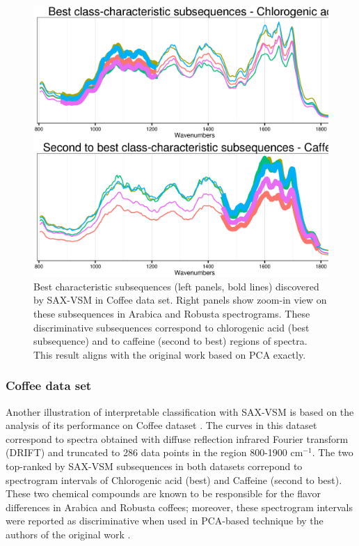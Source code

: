 \begin{figure}[ht]
   \centering
   \includegraphics[width=120mm]{figures/coffee_patterns.ps}
   \caption{
   Best characteristic subsequences (left panels, bold lines) discovered by SAX-VSM in
   {Coffee data set}. Right panels show zoom-in view on these subsequences in Arabica
   and Robusta spectrograms.
   These discriminative subsequences correspond to chlorogenic acid (best subsequence) 
   and to caffeine (second to best) regions of spectra. This result aligns with
   the original work based on PCA \cite{citeulike:12550833} exactly.
   }
   \label{fig:coffee}
\end{figure}

\subsubsection{Coffee data set}
Another illustration of interpretable classification with SAX-VSM is based on the analysis of its
performance on Coffee dataset \cite{citeulike:12550833}. The curves in this dataset correspond to spectra
obtained with diffuse reflection infrared Fourier transform (DRIFT) and truncated to 286 data points
in the region 800-1900 cm$^{-1}$. The two top-ranked by SAX-VSM subsequences in both datasets
correpond to spectrogram intervals of Chlorogenic acid (best) and Caffeine (second to best).
These two chemical compounds are known to be responsible for the flavor differences in 
Arabica and Robusta coffees; moreover, these spectrogram intervals were reported 
as discriminative when used in PCA-based technique by the authors of the original work
\cite{citeulike:12550833}.

